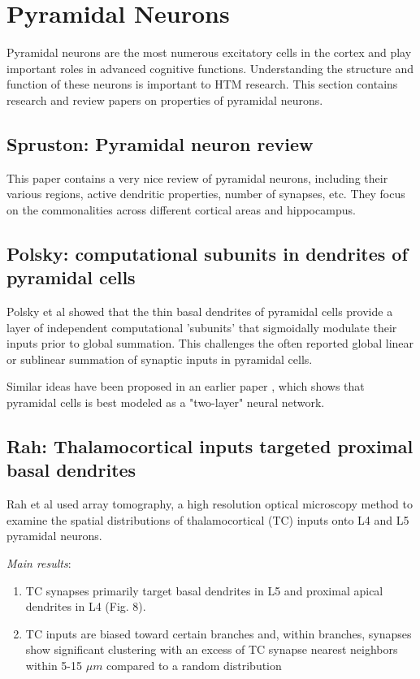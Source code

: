 \documentclass{article} %
\begin{document}
\section{Pyramidal Neurons}

Pyramidal neurons are the most numerous excitatory cells in the cortex and play
important roles in advanced cognitive functions. Understanding the
structure and function of
these neurons is important to HTM research.   This section  contains research
and review papers on properties of pyramidal neurons.

\subsection{Spruston: Pyramidal neuron review}

This paper \cite{Spruston2008} contains a very nice review of
pyramidal neurons, including their various regions, active dendritic
properties, number of synapses, etc. They focus on the commonalities across
different cortical areas and hippocampus.

\subsection{Polsky: computational subunits in dendrites of pyramidal cells}
Polsky et al \cite{Polsky2004} showed that the thin basal dendrites of pyramidal
cells provide a layer of independent computational 'subunits' that sigmoidally 
modulate their inputs prior to global summation. This challenges the often reported 
global linear or sublinear summation of synaptic inputs in pyramidal cells.

Similar ideas have been proposed in an earlier paper \cite{Poirazi2003}, which
shows that pyramidal cells is best modeled as a "two-layer" neural network. 

\subsection{Rah: Thalamocortical inputs targeted proximal basal dendrites}
Rah et al \cite{Rah2013} used array tomography, a high resolution optical 
microscopy method to examine the spatial distributions of thalamocortical (TC) 
inputs onto L4 and L5 pyramidal neurons. 

\emph{Main results}:
\begin{enumerate}
\item TC synapses primarily target basal dendrites in L5 and proximal apical
dendrites in L4 (Fig. 8).
\item TC inputs are biased toward certain branches and, within branches,
synapses show significant clustering with an excess of TC synapse nearest 
neighbors within 5-15 $\mu m$ compared to a random distribution
\end{enumerate}
\end{document}
